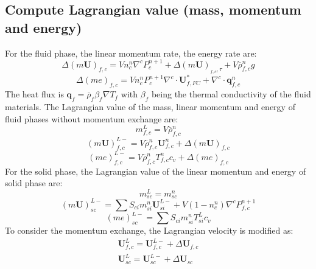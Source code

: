 \documentclass[preprint,12pt]{elsarticle}
\begin{document}
\subsection{\textsf{Compute Lagrangian value (mass, momentum and energy)}}
For the fluid phase, the linear momentum rate, the energy rate are:
\begin{equation}
 \Delta (m \pmb{U})_{f,c} = V n_c^n \nabla^c P_{c}^{n+1} +\Delta (m \pmb{U})_{_{f,c},\tau} + V \overline{\rho}_{f,c}^n g
\end {equation}
%
%
\begin{equation}
 \Delta (me)_{f,c} = V n_c^n P_{c}^{n+1} \nabla^c \cdot \pmb{U}_{f,FC}^{*} + \nabla^c \cdot \pmb{q}_{f,c}^n
\end {equation}
%
%
The heat flux is $\pmb{q}_f = \overline{\rho}_f \beta_f \nabla T_f$ with $\beta_f$ being the thermal conductivity of the fluid materials. The Lagrangian value of the mass, linear momentum and energy of fluid phases without momentum exchange are:
%
%
\begin{equation}
 m_{f,c}^L = V \overline{\rho}_{f,c}^n 
\end {equation}
%
%
\begin{equation}
 (m \pmb{U})_{f,c}^{L-} = V \overline{\rho}_{f,c}^n \pmb{U}_{f,c}^n + \Delta (m \pmb{U})_{f,c} 
\end {equation}
%
%
\begin{equation}
 (me)_{f,c}^{L-} = V \overline{\rho}_{f,c}^n T_{f,c}^n    c_v + \Delta (me)_{f,c} 
\end {equation}
%
%
For the solid phase, the Lagrangian value of the linear momentum and energy of solid phase are:
%
\begin{equation}
 m_{sc}^L = m_{sc}^n
\end {equation}
%
\begin{equation}
 (m \pmb{U})_{sc}^{L-} = \sum{S_{ci} m_{si}^n \pmb{U}_{si}^{L-}} + V (1-n_c^n) \nabla^c P_{f,c}^{n+1}
\end {equation}
%
\begin{equation}
 (me)_{sc}^{L-} =  \sum{S_{ci} m_{si}^n T_{si}^L} c_v
\end {equation}
%
%
To consider the momentum exchange, the Lagrangian velocity is modified as:
%
\begin{equation}
\begin{gathered}
\pmb{U}_{f,c}^{L} = \pmb{U}_{f,c}^{L-} + \Delta \pmb{U}_{f,c} \\
\pmb{U}_{sc}^{L} = \pmb{U}_{sc}^{L-} + \Delta \pmb{U}_{sc}
\end {gathered}
\end {equation}
\end{document}
